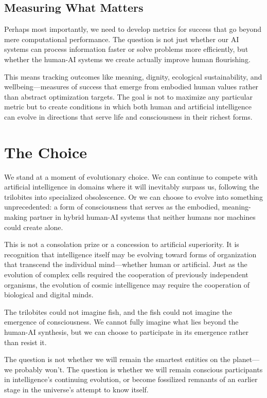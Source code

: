 \subsection{Measuring What Matters}

Perhaps most importantly, we need to develop metrics for success that go beyond mere computational performance. The question is not just whether our AI systems can process information faster or solve problems more efficiently, but whether the human-AI systems we create actually improve human flourishing.

This means tracking outcomes like meaning, dignity, ecological sustainability, and wellbeing—measures of success that emerge from embodied human values rather than abstract optimization targets. The goal is not to maximize any particular metric but to create conditions in which both human and artificial intelligence can evolve in directions that serve life and consciousness in their richest forms.

\section{The Choice}

We stand at a moment of evolutionary choice. We can continue to compete with artificial intelligence in domains where it will inevitably surpass us, following the trilobites into specialized obsolescence. Or we can choose to evolve into something unprecedented: a form of consciousness that serves as the embodied, meaning-making partner in hybrid human-AI systems that neither humans nor machines could create alone.

This is not a consolation prize or a concession to artificial superiority. It is recognition that intelligence itself may be evolving toward forms of organization that transcend the individual mind—whether human or artificial. Just as the evolution of complex cells required the cooperation of previously independent organisms, the evolution of cosmic intelligence may require the cooperation of biological and digital minds.

The trilobites could not imagine fish, and the fish could not imagine the emergence of consciousness. We cannot fully imagine what lies beyond the human-AI synthesis, but we can choose to participate in its emergence rather than resist it.

The question is not whether we will remain the smartest entities on the planet—we probably won't. The question is whether we will remain conscious participants in intelligence's continuing evolution, or become fossilized remnants of an earlier stage in the universe's attempt to know itself.

